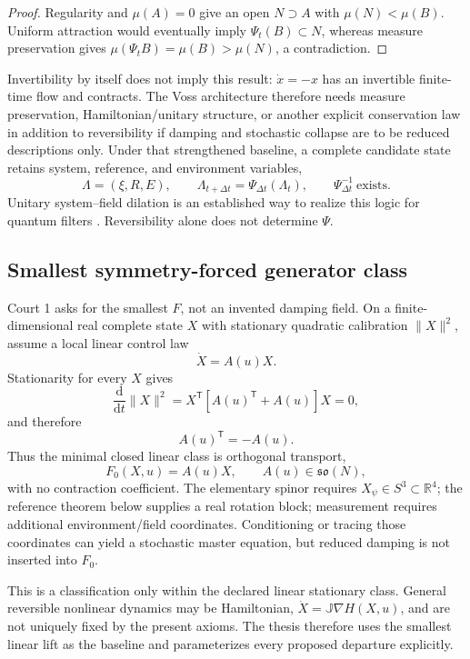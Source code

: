 \documentclass[10pt]{article}
\theoremstyle{definition}
\theoremstyle{remark}
\newcommand{\R}{\mathbb R}
\newcommand{\dd}{\mathrm d}
\begin{document}
\begin{proof}
Regularity and \(\mu(A)=0\) give an open \(N\supset A\) with \(\mu(N)<\mu(B)\). Uniform attraction would eventually imply \(\Psi_t(B)\subset N\), whereas measure preservation gives \(\mu(\Psi_tB)=\mu(B)>\mu(N)\), a contradiction.
\end{proof}

Invertibility by itself does not imply this result: \(\dot x=-x\) has an invertible finite-time flow and contracts. The Voss architecture therefore needs measure preservation, Hamiltonian/unitary structure, or another explicit conservation law in addition to reversibility if damping and stochastic collapse are to be reduced descriptions only. Under that strengthened baseline, a complete candidate state retains system, reference, and environment variables,
\begin{equation}
  \Lambda=(\xi,R,E),\qquad
  \Lambda_{t+\Delta t}=\Psi_{\Delta t}(\Lambda_t),
  \qquad \Psi_{\Delta t}^{-1}\ \text{exists}.
  \label{eq:reversible-lift}
\end{equation}
Unitary system--field dilation is an established way to realize this logic for quantum filters \citep{Bouten2007,WisemanMilburn2010}. Reversibility alone does not determine \(\Psi\).

\subsection{Smallest symmetry-forced generator class}

Court 1 asks for the smallest \(F\), not an invented damping field. On a finite-dimensional real complete state \(X\) with stationary quadratic calibration \(\|X\|^2\), assume a local linear control law
\[
\dot X=A(u)X.
\]
Stationarity for every \(X\) gives
\[
\frac{\dd}{\dd t}\|X\|^2
=X^\mathsf T[A(u)^\mathsf T+A(u)]X=0,
\]
and therefore
\begin{equation}
  A(u)^\mathsf T=-A(u).
  \label{eq:minimal-skew-generator}
\end{equation}
Thus the minimal closed linear class is orthogonal transport,
\[
F_0(X,u)=A(u)X,\qquad A(u)\in\mathfrak{so}(N),
\]
with no contraction coefficient. The elementary spinor requires \(X_\psi\in S^3\subset\R^4\); the reference theorem below supplies a real rotation block; measurement requires additional environment/field coordinates. Conditioning or tracing those coordinates can yield a stochastic master equation, but reduced damping is not inserted into \(F_0\).

This is a classification only within the declared linear stationary class. General reversible nonlinear dynamics may be Hamiltonian,
\(\dot X=\mathbb J\nabla H(X,u)\), and are not uniquely fixed by the present axioms. The thesis therefore uses the smallest linear lift as the baseline and parameterizes every proposed departure explicitly.
\end{document}
